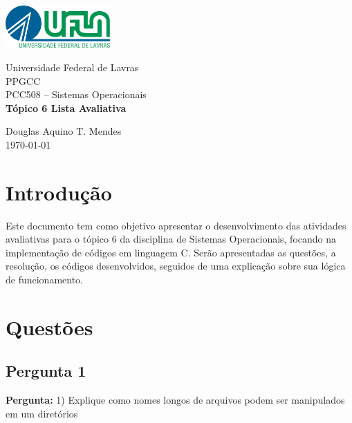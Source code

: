 \documentclass{article}
\begin{document}
\begin{titlepage}
    \centering
    \includegraphics[width=0.3\textwidth]{../../Topic1/Avaliativo/Imagens/Logo UFLA - Colorida chapada.png}

    \vspace*{2cm} %
    \Large
    Universidade Federal de Lavras\\
    PPGCC\\
    PCC508 – Sistemas Operacionais\\
    
    \vspace{2cm} %
    \huge %
    \textbf{Tópico 6 Lista Avaliativa}
    
    \vfill %
    
    \large
    Douglas Aquino T. Mendes\\
    \today %
\end{titlepage}

\tableofcontents
\newpage

\section{Introdução}
Este documento tem como objetivo apresentar o desenvolvimento das atividades avaliativas para o tópico 6 da disciplina de Sistemas Operacionais, focando na implementação de códigos em linguagem C. Serão apresentadas as questões, a resolução, os códigos desenvolvidos, seguidos de uma explicação sobre sua lógica de funcionamento.

\section{Questões}

\subsection{Pergunta 1}
\textbf{Pergunta:} 1) Explique como nomes longos de arquivos podem ser manipulados em um diretórios\newline
\end{document}
